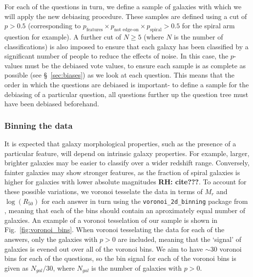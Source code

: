\documentclass[useAMS,usenatbib]{mn2e}
\newcommand{\rh}[1]{{\bf \textcolor{RoyalPurple}{RH: #1}}}
\begin{document}
For each of the questions in turn, we define a sample of galaxies with which we will apply the new debiasing procedure. These samples are defined using a cut of $p>0.5$ (corresponding to $p_{\textrm{features}} \times p_{\textrm{not edge-on}} \times p_{\textrm{spiral}} > 0.5$ for the spiral arm question for example). A further cut of $N \geq 5$ (where $N$ is the number of classifications) is also imposed to ensure that each galaxy has been classified by a significant number of people to reduce the effects of noise. In this case, the $p$-values must be the debiased vote values, to ensure each sample is as complete as possible (see \S~\ref{sec:biases}) as we look at each question. This means that the order in which the questions are debiased is important- to define a sample for the debiasing of a particular question, all questions further up the question tree must have been debiased beforehand.
\subsubsection{Binning the data}
\label{sec:binning}

It is expected that galaxy morphological properties, such as the presence of a particular feature, will depend on intrinsic galaxy properties.  For example, larger, brighter galaxies may be easier to classify over a wider redshift range. Conversely, fainter galaxies may show stronger features, as the fraction of spiral galaxies is higher for galaxies with lower absolute magnitudes \rh{cite???}. To account for these possible variations, we voronoi tesselate the data in terms of $M_r$ and $\log(R_{50})$ for each answer in turn using the \texttt{voronoi\_2d\_binning} package from \cite{Cappellari_03}, meaning that each of the bins should contain an aproximately equal number of galaxies.  An example of a voronoi tesselation of our sample is shown in Fig.~\ref{fig:voronoi_bins}. When voronoi tesselating the data for each of the answers, only the galaxies with $p>0$ are included, meaning that the `signal' of galaxies is evened out over all of the voronoi bins. We aim to have $\sim 30$ voronoi bins for each of the questions, so the bin signal for each of the voronoi bins is given as $N_{gal}/30$, where $N_{gal}$ is the number of galaxies with $p>0$.  
\end{document}
